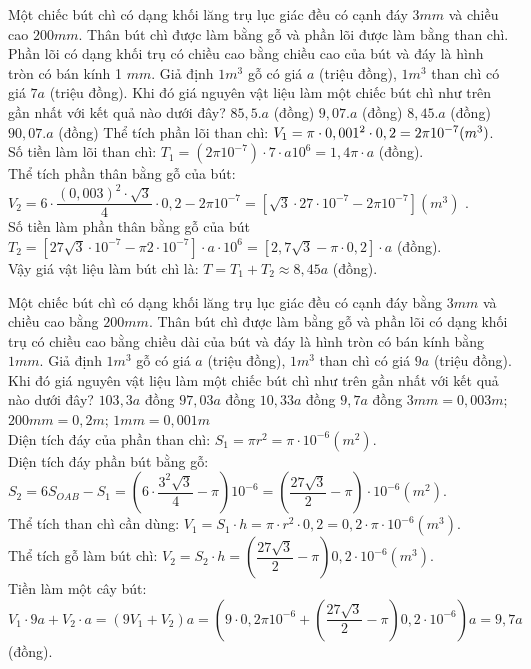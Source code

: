 \begin{ex}%
	Một chiếc bút chì có dạng khối lăng trụ lục giác đều có cạnh đáy $3mm$ và chiều cao $200 mm$. Thân bút chì được làm bằng gỗ và phần lõi được làm bằng than chì. Phần lõi có dạng khối trụ có chiều cao bằng chiều cao của bút và đáy là hình tròn có bán kính 1 $mm$. Giả định $1 {m^3}$ gỗ có giá $a$ (triệu đồng), $1 {m^3}$ than chì có giá $7a$ (triệu đồng). Khi đó giá nguyên vật liệu làm một chiếc bút chì như trên gần nhất với kết quả nào dưới đây?
	\choice
	{$85,5.a$ (đồng)}
	{$9,07.a$ (đồng)}
	{\True$8,45.a$ (đồng)}
	{$90,07.a$ (đồng)}
	\loigiai
	{Thể tích phần lõi than chì: $V_1=\pi\cdot {0,001^2}\cdot 0,2=2\pi{10^{-7}} \text (m^{3})$.\\
		Số tiền làm lõi than chì: $T_1=(2\pi{10^{-7}})\cdot7\cdot a{10^6}=1,4\pi \cdot a$ (đồng).\\
		Thể tích phần thân bằng gỗ của bút:\\
		$V_2=6\cdot \dfrac{(0,003)^2\cdot \sqrt{3}}{4}\cdot 0,2-2\pi{10^{-7}}=\left[\sqrt{3}\cdot{27\cdot10^{-7}}-2\pi{10^{-7}}\right]({m^3})$ .\\
		Số tiền làm phần thân bằng gỗ của bút\\
		$T_2=\left[27\sqrt{3}\cdot{10^{-7}}-\pi{2\cdot10^{-7}}\right]\cdot a\cdot{10^6}=\left[2,7\sqrt{3}-\pi \cdot 0,2\right]\cdot a$ (đồng).\\
		Vậy giá vật liệu làm bút chì là: $T=T_1+T_2\approx 8,45a$ (đồng).
	}
\end{ex}
\begin{ex}%
	Một chiếc bút chì có dạng khối lăng trụ lục giác đều có cạnh đáy bằng $3 mm$ và chiều cao bằng $200mm$. Thân bút chì được làm bằng gỗ và phần lõi có dạng khối trụ có chiều cao bằng chiều dài của bút và đáy là hình tròn có bán kính bằng $1mm$. Giả định $1m^3$ gỗ có giá $a$ (triệu đồng), $1m^3$ than chì có giá $9a$ (triệu đồng). Khi đó giá nguyên vật liệu làm một chiếc bút chì như trên gần nhất với kết quả nào dưới đây?
	\choice
	{$103,3a$ đồng}
	{$97,03a$ đồng}
	{$10,33a$ đồng}
	{\True$9,7a$ đồng}
	\loigiai
	{
		$3mm=0,003m$; $200mm=0,2m$; $1mm=0,001m$\\
		Diện tích đáy của phần than chì: $S_1=\pi{r^2}=\pi\cdot{10^{-6}}(m^2)$.\\
		Diện tích đáy phần bút bằng gỗ:\\ $S_2=6S_{OAB}-S_1=\left(6\cdot \dfrac{3^2\sqrt{3}}{4}-\pi\right){10^{-6}}=\left(\dfrac{27\sqrt{3}}{2}-\pi\right)\cdot{10^{-6}}(m^2)$.\\
		Thể tích than chì cần dùng: $V_1=S_1\cdot h=\pi\cdot{r^2}\cdot0,2=0,2\cdot \pi\cdot{10^{-6}}(m^3)$.\\
		Thể tích gỗ làm bút chì: $V_2=S_2\cdot h=\left(\dfrac{27\sqrt{3}}{2}-\pi\right){0,2\cdot 10^{-6}}(m^3)$.\\
		Tiền làm một cây bút:\\ $V_1\cdot9a+V_2\cdot a=\left(9V_1+V_2\right)a=\left(9\cdot0,2\pi{10^{-6}}+\left(\dfrac{27\sqrt{3}}{2}-\pi\right){0,2\cdot10^{-6}}\right) a=9,7 a$ (đồng).}
\end{ex}

